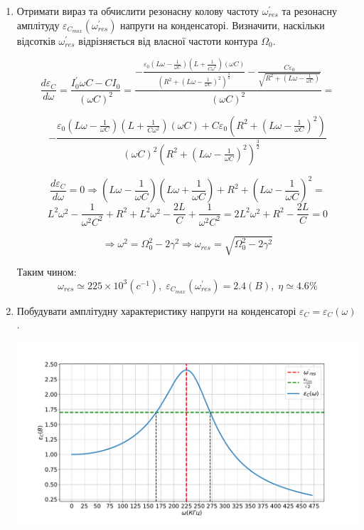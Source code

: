 \documentclass[a4paper, 12pt]{article}
\begin{document}
\begin{enumerate}
    \item Отримати вираз та обчислити резонасну колову частоту $\omega_{res}^{'}$ та
    резонасну амплітуду $\varepsilon_{C_{max}}(\omega_{res}^{'})$ напруги на конденсаторі.
    Визначити, наскільки відсотків $\omega_{res}^{'}$ відрізняється від власної частоти контура $\Omega_0$.
    
    $$ \frac{d \varepsilon_C}{d\omega} = \frac{I_0^{'} \omega C - C I_0}{(\omega C)^2} = 
    \frac{-\frac{\varepsilon_0 \left( L \omega - \frac{1}{\omega C} \right) \left( L + \frac{1}{C \omega^2} \right) \left( \omega C  \right)}
    { \left(R^2 + \left( L \omega - \frac{1}{\omega C} \right)^2 \right)^{\frac{3}{2}} } - \frac{C \varepsilon_0}{\sqrt{R^2 + \left( L \omega - \frac{1}{\omega C} \right)}} } {\left( \omega C \right)^2} = $$
    
    $$ - \frac{\varepsilon_0 \left( L \omega - \frac{1}{\omega C} \right) \left( L + \frac{1}{C \omega^2} \right) \left( \omega C  \right) + C \varepsilon_0 \left(R^2 + \left( L \omega - \frac{1}{\omega C} \right)^2 \right) }
    {\left( \omega C \right)^2 \left(R^2 + \left( L \omega - \frac{1}{\omega C} \right)^2 \right)^{\frac{3}{2}}} $$
    
    $$ \frac{d \varepsilon_C}{d\omega} = 0 \Rightarrow 
    \left( L \omega - \frac{1}{\omega C} \right) \left( L \omega + \frac{1}{\omega C} \right) +
    R^2 + \left( L \omega - \frac{1}{\omega C} \right)^2 = $$ 
    $$ L^2 \omega^2 - \frac{1}{\omega^2 C^2} + R^2 + L^2 \omega^2 - \frac{2L}{C} + \frac{1}{\omega^2 C^2} =
    2 L^2 \omega^2 + R^2 - \frac{2L}{C} = 0 $$
    
    $$ \Rightarrow \omega^2 = \Omega_0^2 - 2\gamma^2 \Rightarrow \omega_{res} = \sqrt{\Omega_0^2 - 2\gamma^2} $$
    
    Таким чином:
    $$ \omega_{res} \simeq 225\times10^3(c^{-1}),\; 
    \varepsilon_{C_{max}}(\omega_{res}^{'}) = 2.4(B), \;
    \eta \simeq 4.6\% $$

    \item Побудувати амплітудну характеристику напруги на конденсаторі $\varepsilon_C = \varepsilon_C(\omega)$.
    
    \includegraphics[width=1.0\textwidth]{graphics/EC(w).pdf}


\end{enumerate}
\end{document}
